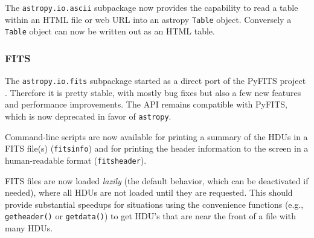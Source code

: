 \documentclass[modern]{aastex61}
\newcommand{\package}[1]{\texttt{#1}\xspace}
\newcommand{\astropypkg}{\package{astropy}}
\newcommand{\inlinecomment}[2]{\todo[inline]{#1: #2}\xspace}
\begin{document}

The \package{astropy.io.ascii} subpackage now provides the capability
to read a table within an HTML file or web URL into an astropy
\texttt{Table} object. Conversely a \texttt{Table} object can now
be written out as an HTML table.

\subsubsection{FITS}

The \package{astropy.io.fits} subpackage started as a direct port of the
PyFITS project \citep{PyFITS}. Therefore it is pretty stable, with mostly bug
fixes but also a few new features and performance improvements.  The API
remains compatible with PyFITS, which is now deprecated in favor of
\astropypkg.

Command-line scripts are now available for printing a summary of the HDUs in
a FITS file(s) (\texttt{fitsinfo}) and for printing the header information to
the screen in a human-readable format (\texttt{fitsheader}).

FITS files are now loaded \emph{lazily} (the default behavior, which can be
deactivated if needed), where all HDUs are not loaded until they are
requested. This should provide substantial speedups for situations using the
convenience functions (e.g., \texttt{getheader()} or \texttt{getdata()}) to
get HDU’s that are near the front of a file with many HDUs.





\end{document}
